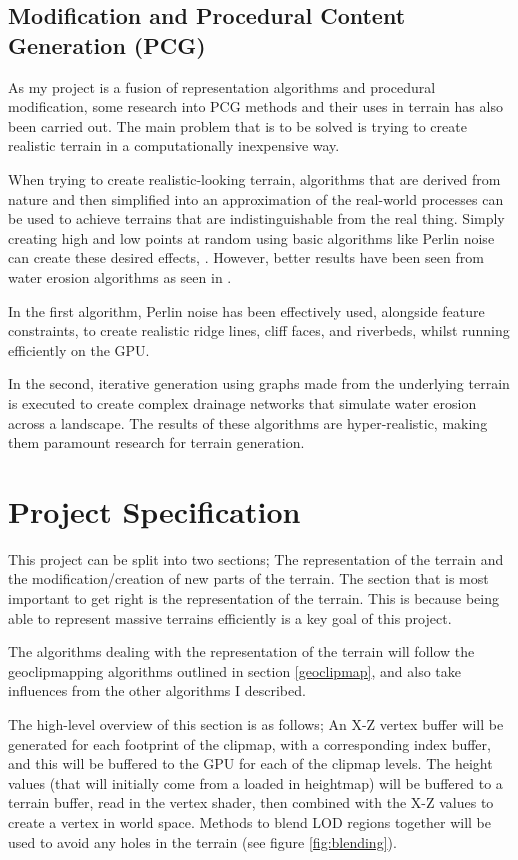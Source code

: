 \documentclass[notitlepage,12pt]{article}
\begin{document}
\subsection{Modification and Procedural Content Generation (PCG)} \label{pcg}

As my project is a fusion of representation algorithms and procedural modification, some research into PCG methods and their uses in terrain has also been carried out. The main problem that is to be solved is trying to create realistic terrain in a computationally inexpensive way.

When trying to create realistic-looking terrain, algorithms that are derived from nature and then simplified into an approximation of the real-world processes can be used to achieve terrains that are indistinguishable from the real thing. Simply creating high and low points at random using basic algorithms like Perlin noise can create these desired effects, \cite{perlin}. However, better results have been seen from water erosion algorithms as seen in \cite{hydrology}.

In the first algorithm, Perlin noise has been effectively used, alongside feature constraints, to create realistic ridge lines, cliff faces, and riverbeds, whilst running efficiently on the GPU. 

In the second, iterative generation using graphs made from the underlying terrain is executed to create complex drainage networks that simulate water erosion across a landscape. The results of these algorithms are hyper-realistic, making them paramount research for terrain generation.

\section{Project Specification}

This project can be split into two sections; The representation of the terrain and the modification/creation of new parts of the terrain. The section that is most important to get right is the representation of the terrain. This is because being able to represent massive terrains efficiently is a key goal of this project.

The algorithms dealing with the representation of the terrain will follow the geoclipmapping algorithms outlined in section \ref{geoclipmap}, and also take influences from the other algorithms I described. 

The high-level overview of this section is as follows; An X-Z vertex buffer will be generated for each footprint of the clipmap, with a corresponding index buffer, and this will be buffered to the GPU for each of the clipmap levels. The height values (that will initially come from a loaded in heightmap) will be buffered to a terrain buffer, read in the vertex shader, then combined with the X-Z values to create a vertex in world space. Methods to blend LOD regions together will be used to avoid any holes in the terrain (see figure \ref{fig:blending}).
\end{document}
